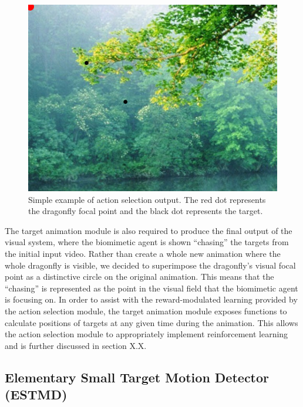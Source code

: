 \documentclass[a4paper,11pt]{article}
\begin{document}
\begin{figure}[h]
\centering
\includegraphics[scale = 0.3]{ta}
\caption{Simple example of action selection output. The red dot represents the dragonfly focal point and the black dot represents the target.}
\label{target_animation_example}
\end{figure}


The target animation module is also required to produce the final output of the visual system, where the biomimetic agent is shown ``chasing'' the targets from the initial input video. Rather than create a whole new animation where the whole dragonfly is visible, we decided to superimpose the dragonfly's visual focal point as a distinctive circle on the original animation. This means that the ``chasing'' is represented as the point in the visual field that the biomimetic agent is focusing on. In order to assist with the reward-modulated learning provided by the action selection module, the target animation module exposes functions to calculate positions of targets at any given time during the animation. This allows the action selection module to appropriately implement reinforcement learning and is further discussed in section X.X.

\subsection{Elementary Small Target Motion Detector (ESTMD)}
\end{document}
